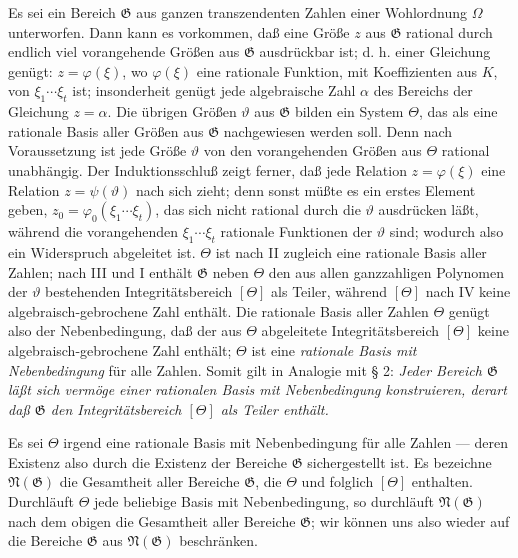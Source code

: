 Es sei ein Bereich $\mathfrak G$ aus ganzen transzendenten Zahlen einer
Wohlordnung $\Omega$ unterworfen. Dann kann es vorkommen, daß eine Größe $z$
aus $\mathfrak G$ rational durch endlich viel vorangehende Größen aus
$\mathfrak G$ ausdrückbar ist; d. h. einer Gleichung genügt:
$z=\varphi(\xi)$, wo $\varphi(\xi)$ eine rationale Funktion, mit Koeffizienten
aus $K$, von $\xi_1\cdots\xi_t$ ist; insonderheit genügt jede algebraische
Zahl $\alpha$ des Bereichs der Gleichung $z=\alpha$. Die übrigen Größen
$\vartheta$ aus $\mathfrak G$ bilden ein System $\Theta$, das als eine rationale
Basis aller Größen aus $\mathfrak G$ nachgewiesen werden soll. Denn nach
Voraussetzung ist jede Größe $\vartheta$ von den vorangehenden Größen aus
$\Theta$ rational unabhängig. Der Induktionsschluß zeigt ferner, daß jede Relation $z=\varphi(\xi)$ eine Relation
$z=\psi(\vartheta)$ nach sich zieht; denn sonst müßte es ein erstes Element
geben, $z_0=\varphi_0(\xi_1\cdots\xi_t)$, das sich nicht rational durch die
$\vartheta$ ausdrücken läßt, während die vorangehenden
$\xi_1\cdots\xi_t$ rationale Funktionen der $\vartheta$ sind; wodurch also ein
Widerspruch abgeleitet ist. $\Theta$ ist nach II zugleich eine rationale Basis
aller Zahlen; nach III und I enthält $\mathfrak G$ neben $\Theta$ den aus allen
ganzzahligen Polynomen der $\vartheta$ bestehenden Integritätsbereich $[\Theta]$
als Teiler, während $[\Theta]$ nach IV keine algebraisch-gebrochene Zahl
enthält. Die rationale Basis aller Zahlen $\Theta$ genügt also der
Nebenbedingung, daß der aus $\Theta$ abgeleitete Integritätsbereich $[\Theta]$
keine algebraisch-gebrochene Zahl enthält; $\Theta$ ist eine \emph{rationale Basis mit
Nebenbedingung} für alle Zahlen. Somit gilt in Analogie mit § 2: \emph{Jeder
Bereich $\mathfrak G$ läßt sich vermöge einer rationalen Basis mit
Nebenbedingung konstruieren, derart daß $\mathfrak G$ den Integritätsbereich
$[\Theta]$ als Teiler enthält.}

Es sei $\Theta$ irgend eine rationale Basis mit Nebenbedingung für alle Zahlen
--- deren Existenz also durch die Existenz der Bereiche $\mathfrak G$
sichergestellt ist. Es bezeichne $\mathfrak N(\mathfrak G)$ die Gesamtheit aller
Bereiche $\mathfrak G$, die $\Theta$ und folglich $[\Theta]$ enthalten.
Durchläuft $\Theta$ jede beliebige Basis mit Nebenbedingung, so durchläuft
$\mathfrak N(\mathfrak G)$ nach dem obigen die Gesamtheit aller Bereiche
$\mathfrak G$; wir können uns also wieder auf die Bereiche $\mathfrak G$ aus
$\mathfrak N(\mathfrak G)$ beschränken.

